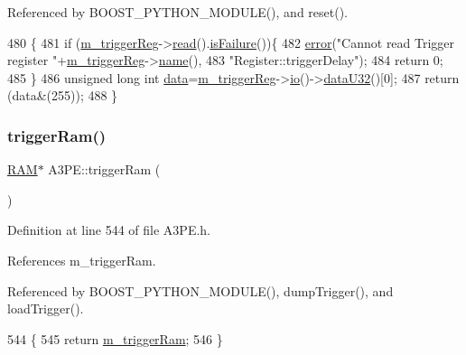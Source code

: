 Referenced by B\+O\+O\+S\+T\+\_\+\+P\+Y\+T\+H\+O\+N\+\_\+\+M\+O\+D\+U\+L\+E(), and reset().


\begin{DoxyCode}
480                                \{
481   \textcolor{keywordflow}{if} (\hyperlink{classA3PE_a750158ae488121ab7969452f061e678c}{m\_triggerReg}->\hyperlink{classIOobject_aa07610c11963b1db6710e3c76ceea456}{read}().\hyperlink{classStatusCode_a5dd22dc6eb2c52fc4cabc58f6dea2eb7}{isFailure}())\{
482     \hyperlink{classObject_a204a95f57818c0f811933917a30eff45}{error}(\textcolor{stringliteral}{"Cannot read Trigger register "}+\hyperlink{classA3PE_a750158ae488121ab7969452f061e678c}{m\_triggerReg}->\hyperlink{classObject_a300f4c05dd468c7bb8b3c968868443c1}{name}(),
483         \textcolor{stringliteral}{"Register::triggerDelay"});
484     \textcolor{keywordflow}{return} 0;
485   \}
486   \textcolor{keywordtype}{unsigned} \textcolor{keywordtype}{long} \textcolor{keywordtype}{int} \hyperlink{namespaceshell_a5ea2525995cedc3efd69ea8a7f034d1e}{data}=\hyperlink{classA3PE_a750158ae488121ab7969452f061e678c}{m\_triggerReg}->\hyperlink{classIOobject_af04fb94137c3d86849f478ac5afab5d1}{io}()->\hyperlink{classIOdata_ab0e3cd09f46c1c3712f797116f6da074}{dataU32}()[0];
487   \textcolor{keywordflow}{return} (data&(255));
488 \}
\end{DoxyCode}
\mbox{\label{classA3PE_aad0f7ac467db22e5608ae6b0957665a1}} 
\subsubsection{\texorpdfstring{trigger\+Ram()}{triggerRam()}}
{\footnotesize\ttfamily \hyperlink{classRAM}{R\+AM}$\ast$ A3\+P\+E\+::trigger\+Ram (\begin{DoxyParamCaption}{ }\end{DoxyParamCaption})\hspace{0.3cm}{\ttfamily [inline]}}



Definition at line 544 of file A3\+P\+E.\+h.



References m\+\_\+trigger\+Ram.



Referenced by B\+O\+O\+S\+T\+\_\+\+P\+Y\+T\+H\+O\+N\+\_\+\+M\+O\+D\+U\+L\+E(), dump\+Trigger(), and load\+Trigger().


\begin{DoxyCode}
544                    \{
545     \textcolor{keywordflow}{return} \hyperlink{classA3PE_a2b40e3937f0aa008ec7073acc5029fcc}{m\_triggerRam};
546   \}
\end{DoxyCode}
\mbox{\label{classA3PE_ada46375753047d6a74acdec442044f39}} 
